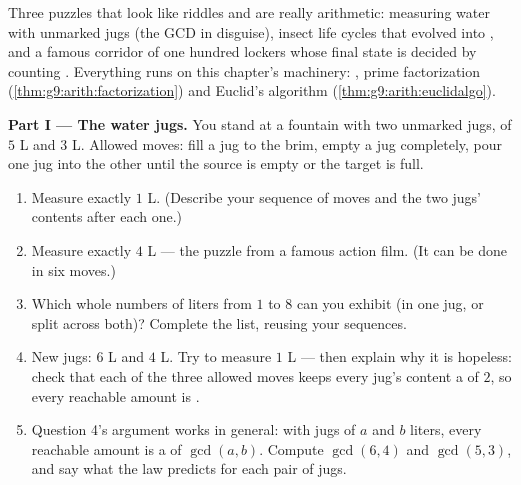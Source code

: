 \begin{problem}
\label{pb:g9:arith:1}
Three puzzles that look like riddles and are really arithmetic:
measuring water with unmarked jugs (the GCD in disguise), insect
life cycles that evolved into , and a famous
corridor of one hundred lockers whose final state is decided by
counting . Everything runs on this chapter's machinery:
, prime factorization
(\cref{thm:g9:arith:factorization}) and Euclid's algorithm
(\cref{thm:g9:arith:euclidalgo}).

\medskip
\noindent\textbf{Part I --- The water jugs.}
You stand at a fountain with two unmarked jugs, of $5$ L and
$3$ L. Allowed moves: fill a jug to the brim, empty a jug
completely, pour one jug into the other until the source is
empty or the target is full.
\begin{enumerate}
  \item Measure exactly $1$ L. (Describe your sequence of moves
        and the two jugs' contents after each one.)
  \item Measure exactly $4$ L --- the puzzle from a famous
        action film. (It can be done in six moves.)
  \item Which whole numbers of liters from $1$ to $8$ can you
        exhibit (in one jug, or split across both)? Complete the
        list, reusing your sequences.
  \item New jugs: $6$ L and $4$ L. Try to measure $1$ L --- then
        explain why it is hopeless: check that each of the three
        allowed moves keeps every jug's content a  of
        $2$, so every reachable amount is .
  \item Question 4's argument works in general: with jugs of $a$
        and $b$ liters, every reachable amount is a  of
        $\gcd(a, b)$. Compute $\gcd(6, 4)$ and $\gcd(5, 3)$, and
        say what the law predicts for each pair of jugs.
\end{enumerate}


\end{problem}
